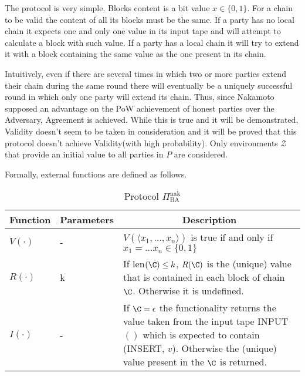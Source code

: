 \documentclass[..]{subfiles}
\begin{document}
The protocol is very simple. Blocks content is a bit value $x \in \{0, 1\}$. For a chain to be valid the content of all its blocks must be the same. If a party has no local chain it expects one and only one value in its input tape and will attempt to calculate a block with such value. If a party has a local chain it will try to extend it with a block containing the same value as the one present in its chain.

Intuitively, even if there are several times in which two or more parties extend their chain during the same round there will eventually be a uniquely successful round in which only one party will extend its chain. Thus, since Nakamoto supposed an advantage on the PoW achievement of honest parties over the Adversary, Agreement is achieved. While this is true and it will be demonstrated, Validity doesn't seem to be taken in consideration and it will be proved that this protocol doesn't achieve Validity(with high probability). Only environments $\mathcal{Z}$ that provide an initial value to all parties in $P$ are considered.

Formally, external functions are defined as follows.

\begin{centering}
	\begin{table}[H]
	\begin{tabular}{m{}<{\centering} m{}<{\centering} m{}}
		\toprule
		\textbf{Function } & \textbf{Parameters} & \multicolumn{1}{c}{\textbf{Description}}\\
		\toprule
		$V(\cdot)$ & - & $V(\langle x_1,\dots,x_n \rangle)$ is true if and only if $x_1 = \dots x_n \in \{0, 1\}$\\
		\hline
		$R(\cdot)$ & k & If len$(\C) \le k$, $R(\C)$ is the (unique) value that is contained in each block of chain $\C$. Otherwise it is undefined.\\
		\hline
		$I(\cdot)$ & - & If $\C = \epsilon$ the functionality returns the value taken from the input tape INPUT$()$ which is expected to contain (INSERT, $v$). Otherwise the (unique) value present in the $\C$ is returned.\\
		\bottomrule
	\end{tabular}
	\caption{Protocol $\Pi_{\textrm{BA}}^{\textrm{nak}}$}
	\label{tab:protocolNak}
	\end{table}
\end{centering}
\end{document}

